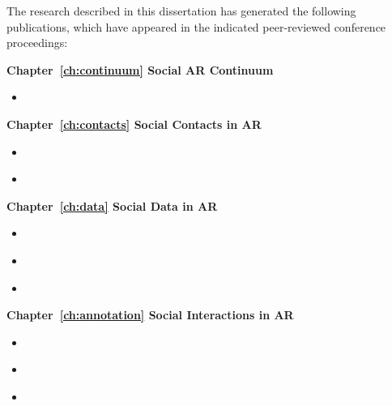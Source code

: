 \begin{preface}
\addchaptertocentry{\prefacename} %

The research described in this dissertation has generated the following publications, which have appeared in the indicated peer-reviewed conference proceedings:

\preto{}

\noindent
\textbf{Chapter~\ref{ch:continuum} Social AR Continuum}
\begin{itemize}
    \item{ }
\end{itemize}

\noindent
\textbf{Chapter~\ref{ch:contacts} Social Contacts in AR}
\begin{itemize}
    \item{ }
    \item{ }
\end{itemize}

\noindent
\textbf{Chapter~\ref{ch:data} Social Data in AR}
\begin{itemize}
    \item{ }
    \item{ }
    \item{ }
\end{itemize}

\noindent
\textbf{Chapter~\ref{ch:annotation} Social Interactions in AR}
\begin{itemize}
    \item{ }
    \item{ }
    \item{ }
\end{itemize}

\end{preface}
